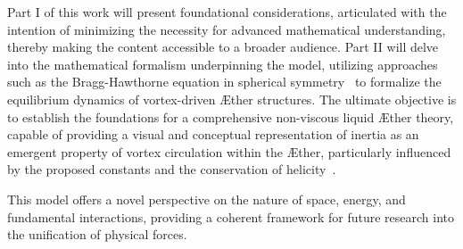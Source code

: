 Part I of this work will present foundational considerations, articulated with the intention of minimizing the necessity for advanced mathematical understanding, thereby making the content accessible to a broader audience.
Part II will delve into the mathematical formalism underpinning the model, utilizing approaches such as the Bragg-Hawthorne equation in spherical symmetry~\cite{keller2024} to formalize the equilibrium dynamics of vortex-driven \AE ther structures.
The ultimate objective is to establish the foundations for a comprehensive non-viscous liquid \AE ther theory, capable of providing a visual and conceptual representation of inertia as an emergent property of vortex circulation within the \AE ther, particularly influenced by the proposed constants and the conservation of helicity~\cite{kleckner2016}.

This model offers a novel perspective on the nature of space, energy, and fundamental interactions, providing a coherent framework for future research into the unification of physical forces.
